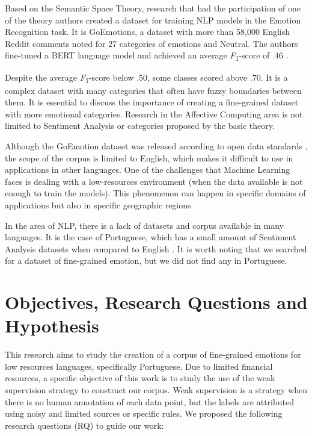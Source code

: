 \documentclass[12pt]{article}
\newcommand{\F}{\textit{F}\textsubscript{1}}
\begin{document}
Based on the Semantic Space Theory, research that had the participation of one of the theory authors created a dataset for training NLP models in the Emotion Recognition task. It is GoEmotions, a dataset with more than 58,000 English Reddit comments noted for 27 categories of emotions and Neutral. The authors fine-tuned a BERT language model and achieved an average \F-score of $.46$ \cite{Demszky2020}.

Despite the average \F-score below $.50$, some classes scored above $.70$. It is a complex dataset with many categories that often have fuzzy boundaries between them. It is essential to discuss the importance of creating a fine-grained dataset with more emotional categories. Research in the Affective Computing area is not limited to Sentiment Analysis or categories proposed by the basic theory.

Although the GoEmotion dataset was released according to open data standards \cite{Demszky2020}, the scope of the corpus is limited to English, which makes it difficult to use in applications in other languages. One of the challenges that Machine Learning faces is dealing with a low-resources environment (when the data available is not enough to train the models). This phenomenon can happen in specific domains of applications but also in specific geographic regions.

In the area of NLP, there is a lack of datasets and corpus available in many languages. It is the case of Portuguese, which has a small amount of Sentiment Analysis datasets when compared to English \cite{Pereira2021}. It is worth noting that we searched for a dataset of fine-grained emotion, but we did not find any in Portuguese.

\section{Objectives, Research Questions and Hypothesis}
\label{sec:objectives}

This research aims to study the creation of a corpus of fine-grained emotions for low resources languages, specifically Portuguese. Due to limited financial resources, a specific objective of this work is to study the use of the weak supervision strategy to construct our corpus. Weak supervision is a strategy when there is no human annotation of each data point, but the labels are attributed using noisy and limited sources or specific rules. We proposed the following research questions (RQ) to guide our work:
\end{document}
